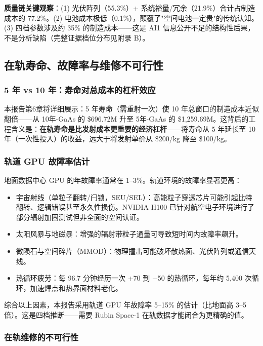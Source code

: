 \textbf{质量链关键观察}：(1) 光伏阵列（55.3\%）+ 系统裕量/冗余（21.9\%）合计占制造成本的 77.2\%。(2) 电池成本极低（0.1\%），颠覆了"空间电池一定贵"的传统认知。(3) 四档参数涉及约 35\% 的制造成本——这是 AI1 信息公开不足的结构性后果，不是分析缺陷（完整证据档位分布见附录 B）。

\subsection{在轨寿命、故障率与维修不可行性}

\subsubsection{5 年 vs 10 年：寿命对总成本的杠杆效应}

本报告第6章将详细展示：5 年寿命（需重射一次）使 10 年总窗口的制造成本近似翻倍——从 10年-GaAs 的 \$696.72M 升至 5年-GaAs 的 \$1,259.69M。这背后的工程含义是：\textbf{在轨寿命是比发射成本更重要的经济杠杆}——将寿命从 5 年延长至 10 年（一次性投入）的收益，远大于将发射单价从 \$200/kg 降至 \$100/kg。

\subsubsection{轨道 GPU 故障率估计}

地面数据中心 GPU 的年故障率通常在 1--3\%。轨道环境的故障率显著更高：

\begin{itemize}[leftmargin=*]
    \item 宇宙射线（单粒子翻转/闩锁，SEU/SEL）：高能粒子穿透芯片可能引起比特翻转、逻辑错误甚至永久性损伤。NVIDIA H100 已针对航空电子环境进行了部分辐射加固测试但非全面的空间认证\cite{newspace2025h100}。
    \item 太阳风暴与地磁暴：增强的辐射带粒子通量可导致短时间内故障率飙升。
    \item 微陨石与空间碎片（MMOD）：物理撞击可能破坏散热面、光伏阵列或通信天线。
    \item 热循环疲劳：每 96.7 分钟经历一次 +70\unitC{} 到 $-$50\unitC{} 的热循环，每年约 5,400 次循环，加速焊点和热界面材料老化。
\end{itemize}

综合以上因素，本报告采用轨道 GPU 年故障率 5--15\% 的估计（比地面高 3--5 倍）。这是四档推断——需要 Rubin Space-1 在轨数据才能闭合为更精确的值。

\subsubsection{在轨维修的不可行性}

